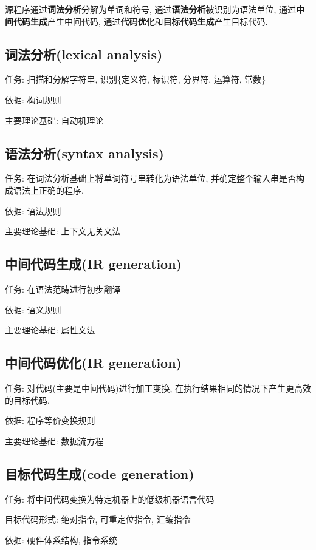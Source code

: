         源程序通过\textbf{词法分析}分解为单词和符号, 通过\textbf{语法分析}被识别为语法单位, 通过\textbf{中间代码生成}产生中间代码, 通过\textbf{代码优化}和\textbf{目标代码生成}产生目标代码.

    \subsection{词法分析(lexical analysis)}

        任务: 扫描和分解字符串, 识别\{定义符, 标识符, 分界符, 运算符, 常数\}

        依据: 构词规则

        主要理论基础: 自动机理论

    \subsection{语法分析(syntax analysis)}

        任务: 在词法分析基础上将单词符号串转化为语法单位, 并确定整个输入串是否构成语法上正确的程序.

        依据: 语法规则

        主要理论基础: 上下文无关文法

    \subsection{中间代码生成(IR generation)}

        任务: 在语法范畴进行初步翻译

        依据: 语义规则

        主要理论基础: 属性文法

    \subsection{中间代码优化(IR generation)}

        任务: 对代码(主要是中间代码)进行加工变换, 在执行结果相同的情况下产生更高效的目标代码.

        依据: 程序等价变换规则

        主要理论基础: 数据流方程

    \subsection{目标代码生成(code generation)}

        任务: 将中间代码变换为特定机器上的低级机器语言代码

        目标代码形式: 绝对指令, 可重定位指令, 汇编指令

        依据: 硬件体系结构, 指令系统
